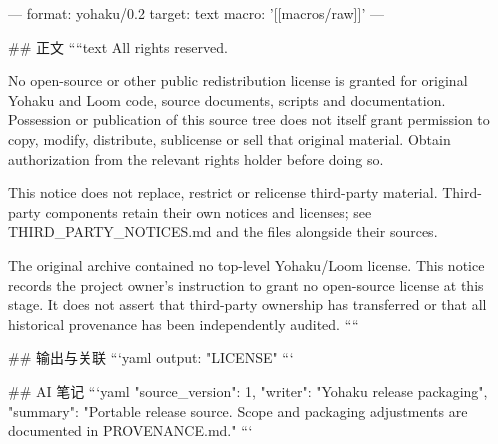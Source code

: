 ---
format: yohaku/0.2
target: text
macro: '[[macros/raw]]'
---

## 正文
````text
All rights reserved.

No open-source or other public redistribution license is granted for original
Yohaku and Loom code, source documents, scripts and documentation. Possession
or publication of this source tree does not itself grant permission to copy,
modify, distribute, sublicense or sell that original material. Obtain
authorization from the relevant rights holder before doing so.

This notice does not replace, restrict or relicense third-party material.
Third-party components retain their own notices and licenses; see
THIRD_PARTY_NOTICES.md and the files alongside their sources.

The original archive contained no top-level Yohaku/Loom license. This notice
records the project owner's instruction to grant no open-source license at
this stage. It does not assert that third-party ownership has transferred or
that all historical provenance has been independently audited.
````

## 输出与关联
```yaml
output: "LICENSE"
```

## AI 笔记
```yaml
{"source_version": 1, "writer": "Yohaku release packaging", "summary": "Portable release source. Scope and packaging adjustments are documented in PROVENANCE.md."}
```
